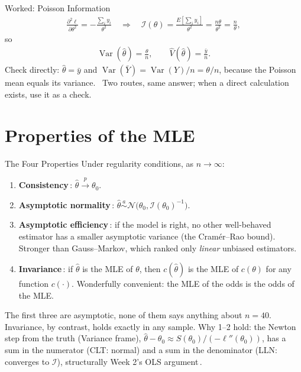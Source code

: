 \documentclass[aspectratio=169,11pt,xcolor=dvipsnames]{beamer}
\DeclareMathOperator{\Var}{Var}
\newcommand{\E}{E}
\newcommand{\pto}{\overset{p}{\longrightarrow}}
\newcommand{\loglik}{\ell}
\newcommand{\Info}{\mathcal{I}}
\newcommand{\adv}{\,\raisebox{0.6pt}{\textcolor{accent}{$\bigstar$}}}
\newcommand{\core}{\,\raisebox{0.6pt}{\textcolor{corestar}{$\bigstar$}}}
\begin{document}
\begin{frame}{Worked: Poisson Information}
\begin{align*}
  \frac{\partial^2\loglik}{\partial\theta^2} = -\frac{\sum_i y_i}{\theta^2}
  \quad\Longrightarrow\quad
  \Info(\theta) = \frac{\E[\sum_i y_i]}{\theta^2} = \frac{n\theta}{\theta^2}
  = \frac{n}{\theta} ,
\end{align*}
so
\begin{align*}
  \Var(\hat\theta) = \frac{\theta}{n},
  \qquad
  \hat{V}(\hat\theta) = \frac{\bar y}{n} .
\end{align*}
\vskip4pt
Check directly: $\hat\theta = \bar y$ and $\Var(\bar Y) = \Var(Y)/n =
\theta/n$, because the Poisson mean equals its variance. \checkmark\ Two
routes, same answer; when a direct calculation exists, use it as a check.
\end{frame}

\section[Properties]{Properties of the MLE}
\begin{frame}\sectionpage\end{frame}

\begin{frame}{The Four Properties}
Under regularity conditions, as $n\to\infty$:
\begin{enumerate}\itemsep5pt
  \item \textbf{Consistency}\core: $\hat\theta \pto \theta_0$.
  \item \textbf{Asymptotic normality}\core:
        $\hat\theta \overset{a}{\sim} \mathcal N\big(\theta_0, \Info(\theta_0)^{-1}\big)$.
  \item \textbf{Asymptotic efficiency}\adv: if the model is right, no
        other well-behaved estimator has a smaller asymptotic variance (the
        \alert{Cramér--Rao bound}). Stronger than Gauss--Markov, which ranked
        only \emph{linear} unbiased estimators.
  \item \textbf{Invariance}\adv: if $\hat\theta$ is the MLE of $\theta$, then
        $c(\hat\theta)$ is the MLE of $c(\theta)$ for any function $c(\cdot)$.
        Wonderfully convenient: the MLE of the odds is the odds of the MLE.
\end{enumerate}
\vskip6pt
\alert{The first three are asymptotic}, none of them says anything about
$n = 40$. Invariance, by contrast, holds exactly in any sample.
\vskip2pt
{\footnotesize Why 1--2 hold: the Newton step from the truth (Variance
frame), $\hat\theta - \theta_0 \approx S(\theta_0)/(-\loglik''(\theta_0))$,
has a sum in the numerator (CLT: normal) and a sum in the denominator (LLN:
converges to $\Info$), structurally Week 2's OLS argument\adv.}
\end{frame}
\end{document}
